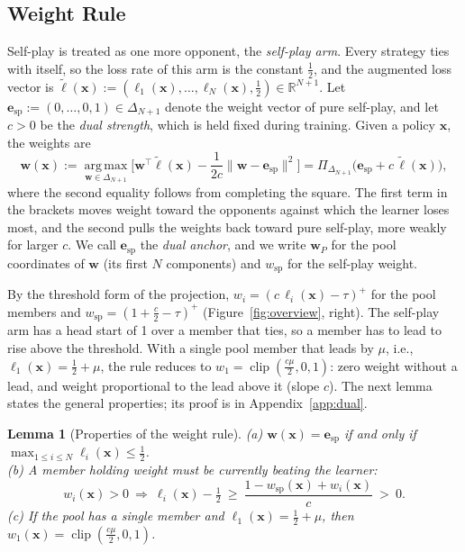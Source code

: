 \documentclass{article} %
\theoremstyle{plain}
\newtheorem{lemma}[theorem]{Lemma}
\theoremstyle{remark}
\newcommand{\Proj}{\Pi}
\newcommand{\simplex}{\Delta}
\newcommand{\bx}{{\bm{x}}}
\newcommand{\bw}{{\bm{w}}}
\newcommand{\be}{{\bm{e}}}
\newcommand{\bell}{{\bm{\ell}}}
\newcommand{\aug}{\tilde{\bell}}
\newcommand{\esp}{\be_{\mathrm{sp}}}
\newcommand{\wsp}{w_{\mathrm{sp}}}
\begin{document}
\subsection{Weight Rule}
\label{sec:dual}

Self-play is treated as one more opponent, the \emph{self-play arm}. Every strategy ties with itself, so the loss rate of this arm is the constant $\tfrac12$, and the augmented loss vector is $\aug(\bx):=(\ell_1(\bx),\dots,\ell_N(\bx),\tfrac12)\in\mathbb R^{N+1}$. Let $\esp:=(0,\dots,0,1)\in\simplex_{N+1}$ denote the weight vector of pure self-play, and let $c>0$ be the \emph{dual strength}, which is held fixed during training. Given a policy $\bx$, the weights are
\begin{equation}
\bw(\bx):=\operatorname*{arg\,max}_{\bw\in\simplex_{N+1}}\Big[\bw^\top\aug(\bx)-\frac1{2c}\|\bw-\esp\|^2\Big]=\Proj_{\simplex_{N+1}}\big(\esp+c\,\aug(\bx)\big),
\label{eq:dual}
\end{equation}
where the second equality follows from completing the square. The first term in the brackets moves weight toward the opponents against which the learner loses most, and the second pulls the weights back toward pure self-play, more weakly for larger $c$. We call $\esp$ the \emph{dual anchor}, and we write $\bw_P$ for the pool coordinates of $\bw$ (its first $N$ components) and $\wsp$ for the self-play weight.

By the threshold form of the projection, $w_i=(c\,\ell_i(\bx)-\tau)^+$ for the pool members and $\wsp=(1+\tfrac c2-\tau)^+$ (Figure~\ref{fig:overview}, right). The self-play arm has a head start of 1 over a member that ties, so a member has to lead to rise above the threshold. With a single pool member that leads by $\mu$, i.e., $\ell_1(\bx)=\tfrac12+\mu$, the rule reduces to $w_1=\operatorname{clip}(\tfrac{c\mu}2,0,1)$: zero weight without a lead, and weight proportional to the lead above it (slope $c$). The next lemma states the general properties; its proof is in Appendix~\ref{app:dual}.

\begin{lemma}[Properties of the weight rule]
\label{lem:dual}
(a) $\bw(\bx)=\esp$ if and only if $\max_{1\le i\le N}\ell_i(\bx)\le\tfrac12$.\\
(b) A member holding weight must be currently beating the learner:
\[
w_i(\bx)>0\ \Longrightarrow\ \ell_i(\bx)-\tfrac12\ \ge\ \frac{1-\wsp(\bx)+w_i(\bx)}{c}\ >\ 0 .
\]
(c) If the pool has a single member and $\ell_1(\bx)=\tfrac12+\mu$, then $w_1(\bx)=\operatorname{clip}(\tfrac{c\mu}{2},0,1)$.
\end{lemma}
\end{document}
